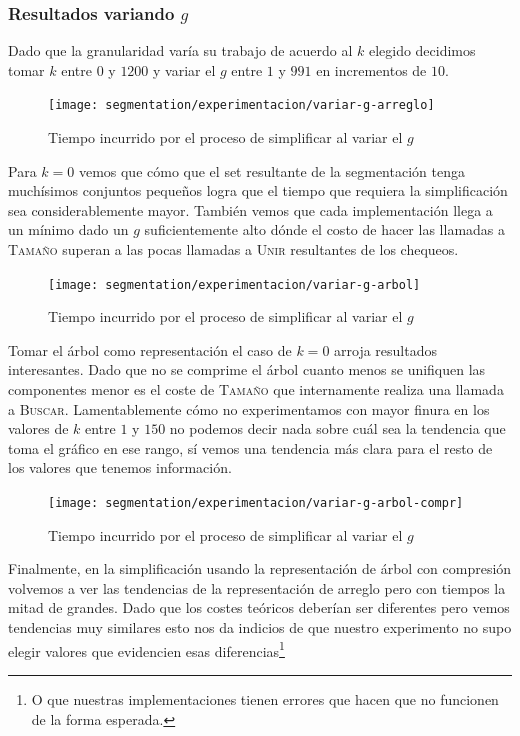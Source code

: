 \subsubsection{Resultados variando $g$}

Dado que la granularidad varía su trabajo de acuerdo al $k$ elegido decidimos
tomar $k$ entre $0$ y $1200$ y variar el $g$ entre $1$ y $991$ en incrementos
de $10$.

\begin{figure}[h]
	\centering
	\texttt{[image: segmentation/experimentacion/variar-g-arreglo]}
	\caption{Tiempo incurrido por el proceso de simplificar al variar el $g$}
\end{figure}

Para $k=0$ vemos que cómo que el set resultante de la segmentación tenga
muchísimos conjuntos pequeños logra que el tiempo que requiera la
simplificación sea considerablemente mayor. También vemos que cada
implementación llega a un mínimo dado un $g$ suficientemente alto dónde el
costo de hacer las llamadas a \textsc{Tamaño} superan a las pocas llamadas a
\textsc{Unir} resultantes de los chequeos.

\begin{figure}[h]
	\centering
	\texttt{[image: segmentation/experimentacion/variar-g-arbol]}
	\caption{Tiempo incurrido por el proceso de simplificar al variar el $g$}
\end{figure}

Tomar el árbol como representación el caso de $k=0$ arroja resultados
interesantes. Dado que no se comprime el árbol cuanto menos se unifiquen las
componentes menor es el coste de \textsc{Tamaño} que internamente realiza una
llamada a \textsc{Buscar}. Lamentablemente cómo no experimentamos con mayor
finura en los valores de $k$ entre $1$ y $150$ no podemos decir nada sobre cuál
sea la tendencia que toma el gráfico en ese rango, sí vemos una tendencia más
clara para el resto de los valores que tenemos información.

\clearpage

\begin{figure}[h]
	\centering
	\texttt{[image: segmentation/experimentacion/variar-g-arbol-compr]}
	\caption{Tiempo incurrido por el proceso de simplificar al variar el $g$}
\end{figure}

Finalmente, en la simplificación usando la representación de árbol con
compresión volvemos a ver las tendencias de la representación de arreglo pero
con tiempos la mitad de grandes. Dado que los costes teóricos deberían ser
diferentes pero vemos tendencias muy similares esto nos da indicios de que
nuestro experimento no supo elegir valores que evidencien esas
diferencias\footnote{O que nuestras implementaciones tienen errores que hacen
que no funcionen de la forma esperada.}
